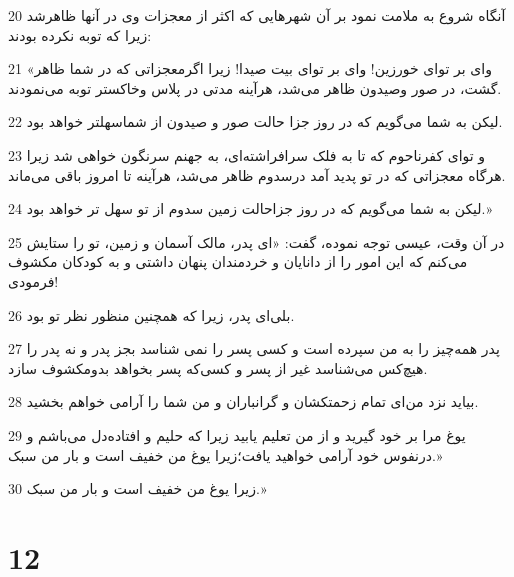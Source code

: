 \par 20 آنگاه شروع به ملامت نمود بر آن شهرهایی که اکثر از معجزات وی در آنها ظاهرشد زیرا که توبه نکرده بودند:
\par 21 «وای بر تو‌ای خورزین! وای بر تو‌ای بیت صیدا! زیرا اگرمعجزاتی که در شما ظاهر گشت، در صور وصیدون ظاهر می‌شد، هرآینه مدتی در پلاس وخاکستر توبه می‌نمودند.
\par 22 لیکن به شما می‌گویم که در روز جزا حالت صور و صیدون از شماسهلتر خواهد بود.
\par 23 و تو‌ای کفرناحوم که تا به فلک سرافراشته‌ای، به جهنم سرنگون خواهی شد زیرا هرگاه معجزاتی که در تو پدید آمد درسدوم ظاهر می‌شد، هرآینه تا امروز باقی می‌ماند.
\par 24 لیکن به شما می‌گویم که در روز جزاحالت زمین سدوم از تو سهل تر خواهد بود.»
\par 25 در آن وقت، عیسی توجه نموده، گفت: «ای پدر، مالک آسمان و زمین، تو را ستایش می‌کنم که این امور را از دانایان و خردمندان پنهان داشتی و به کودکان مکشوف فرمودی!
\par 26 بلی‌ای پدر، زیرا که همچنین منظور نظر تو بود.
\par 27 پدر همه‌چیز را به من سپرده است و کسی پسر را نمی شناسد بجز پدر و نه پدر را هیچ‌کس می‌شناسد غیر از پسر و کسی‌که پسر بخواهد بدومکشوف سازد.
\par 28 بیاید نزد من‌ای تمام زحمتکشان و گرانباران و من شما را آرامی خواهم بخشید.
\par 29 یوغ مرا بر خود گیرید و از من تعلیم یابید زیرا که حلیم و افتاده‌دل می‌باشم و درنفوس خود آرامی خواهید یافت؛زیرا یوغ من خفیف است و بار من سبک.»
\par 30 زیرا یوغ من خفیف است و بار من سبک.»

\chapter{12}

